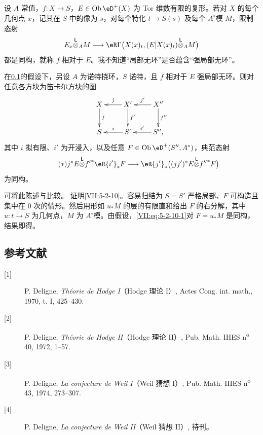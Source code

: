 \subsection{}\label{VII:5-2-9}
设 $A$ 常值，$f:X\to S$，$E\in\ob\eD^+(X)$ 为 Tor 维数有限的复形。若对 $X$ 的每个几何点 $x$，记其在 $S$ 中的像为 $s$，对每个特化 $t\to S(s)$ 及每个 $A^\circ$模 $M$，限制态射
\[
 E_x\lotimes_A M\longrightarrow\eR\Gamma\bigl(X(x)_t,(E|X(x)_t)\lotimes_A M\bigr)
\]
都是同构，就称 $f$ 相对于 $E$。我不知道“局部无环”是否蕴含“强局部无环”。
\begin{proposition_}\label{VII:5-2-10}
在\ref{VII:5-2-9}的假设下，另设 $A$ 为诺特挠环，$S$ 诺特，且 $f$ 相对于 $E$ 强局部无环。则对任意各方块为笛卡尔方块的图
\[\xymatrix{
 X\ar[d]^-f&X'\ar[l]_-j\ar[d]^-{f'}&X''\ar[l]_-{j'}\ar[d]^-{f''}\\
 S&S'\ar[l]_-i&S''\ar[l]_-{i'},
}\]
其中 $i$ 拟有限、$i'$ 为开浸入，以及任意 $F\in\ob\eD^+(S'',A^\circ)$，典范态射
\begin{equation*}\tag{$*$}\label{VII:eq:5-2-10-1}
 j^\ast E\lotimes {f'}^\ast\eR{i'}_\ast F\longrightarrow\eR{j'}_\ast\bigl((jj')^\ast E\lotimes {f''}^\ast F\bigr)
\end{equation*}
为同构。
\end{proposition_}
可将此陈述与\cite[XV 1.17]{sga4}比较。
证明\ref{VII:5-2-10}。容易归结为 $S=S'$ 严格局部、$F$ 可构造且集中在 $0$ 次的情形。然后用形如 $u_\ast M$ 的层的有限直和给出 $F$ 的右分解，其中 $u:t\to S$ 为几何点，$M$ 为 $A^\circ$模。由假设，\eqref{VII:eq:5-2-10-1}对 $F=u_\ast M$ 是同构，结果即得。
\subsection*{参考文献}
\begin{description}
\item[{[1]}] P. Deligne, \emph{Théorie de Hodge I}（Hodge 理论 I）, Actes Cong. int. math., 1970, t. I, 425--430.
\item[{[2]}] P. Deligne, \emph{Théorie de Hodge II}（Hodge 理论 II）, Pub. Math. IHES n\textsuperscript{o} 40, 1972, 1--57.
\item[{[3]}] P. Deligne, \emph{La conjecture de Weil I}（Weil 猜想 I）, Pub. Math. IHES n\textsuperscript{o} 43, 1974, 273--307.
\item[{[4]}] P. Deligne, \emph{La conjecture de Weil II}（Weil 猜想 II）, 待刊。
\end{description}
